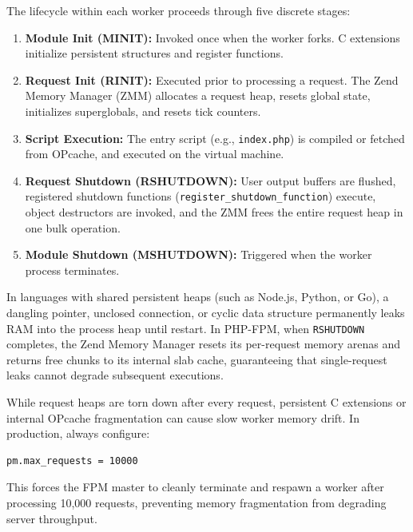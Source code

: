 The lifecycle within each worker proceeds through five discrete stages:
\begin{enumerate}[leftmargin=15pt]
  \item \textbf{Module Init (MINIT):} Invoked once when the worker forks. C extensions initialize persistent structures and register functions.
  \item \textbf{Request Init (RINIT):} Executed prior to processing a request. The Zend Memory Manager (ZMM) allocates a request heap, resets global state, initializes superglobals, and resets tick counters.
  \item \textbf{Script Execution:} The entry script (e.g., \texttt{index.php}) is compiled or fetched from OPcache, and executed on the virtual machine.
  \item \textbf{Request Shutdown (RSHUTDOWN):} User output buffers are flushed, registered shutdown functions (\texttt{register\_shutdown\_function}) execute, object destructors are invoked, and the ZMM frees the entire request heap in one bulk operation.
  \item \textbf{Module Shutdown (MSHUTDOWN):} Triggered when the worker process terminates.
\end{enumerate}

\begin{underthehoodbox}
In languages with shared persistent heaps (such as Node.js, Python, or Go), a dangling pointer, unclosed connection, or cyclic data structure permanently leaks RAM into the process heap until restart. In PHP-FPM, when \texttt{RSHUTDOWN} completes, the Zend Memory Manager resets its per-request memory arenas and returns free chunks to its internal slab cache, guaranteeing that single-request leaks cannot degrade subsequent executions.
\end{underthehoodbox}

\begin{productionwarningbox}
While request heaps are torn down after every request, persistent C extensions or internal OPcache fragmentation can cause slow worker memory drift. In production, always configure:
\begin{lstlisting}[language=sh]
pm.max_requests = 10000
\end{lstlisting}
This forces the FPM master to cleanly terminate and respawn a worker after processing 10,000 requests, preventing memory fragmentation from degrading server throughput.
\end{productionwarningbox}

